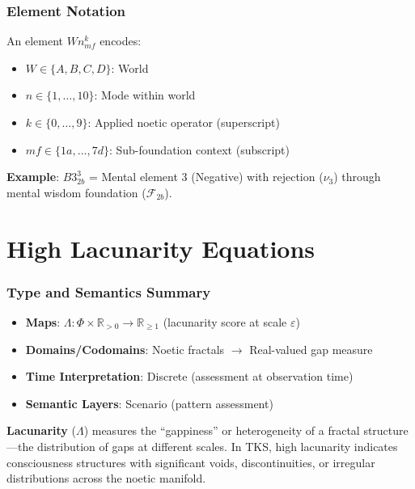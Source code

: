 \documentclass[11pt,twoside]{book}
\newcommand{\noe}[1]{\nu_{#1}}
\newcommand{\Foundations}{\mathcal{F}}
\newcommand{\Frac}{\Phi}
\newcommand{\Lacunarity}{\Lambda}
\begin{document}
\subsection{Element Notation}

An element $Wn^k_{mf}$ encodes:
\begin{itemize}
    \item $W \in \{A, B, C, D\}$: World
    \item $n \in \{1, \ldots, 10\}$: Mode within world
    \item $k \in \{0, \ldots, 9\}$: Applied noetic operator (superscript)
    \item $mf \in \{1a, \ldots, 7d\}$: Sub-foundation context (subscript)
\end{itemize}

\textbf{Example}: $B3^{3}_{2b}$ = Mental element 3 (Negative) with rejection ($\noe{3}$) through mental wisdom foundation ($\Foundations_{2b}$).

\chapter{High Lacunarity Equations}
\label{ch:lacunarity}

\subsection*{Type and Semantics Summary}
\begin{itemize}
    \item \textbf{Maps}: $\Lacunarity : \Frac \times \mathbb{R}_{>0} \to \mathbb{R}_{\geq 1}$ (lacunarity score at scale $\varepsilon$)
    \item \textbf{Domains/Codomains}: Noetic fractals $\to$ Real-valued gap measure
    \item \textbf{Time Interpretation}: Discrete (assessment at observation time)
    \item \textbf{Semantic Layers}: Scenario (pattern assessment)
\end{itemize}

\begin{tcolorbox}[colback=red!5!white,colframe=red!75!black,title=\textbf{Definition: Lacunarity},breakable]
\textbf{Lacunarity} ($\Lacunarity$) measures the ``gappiness'' or heterogeneity of a fractal
structure---the distribution of gaps at different scales. In TKS, high lacunarity
indicates consciousness structures with significant voids, discontinuities, or
irregular distributions across the noetic manifold.
\end{tcolorbox}
\end{document}

